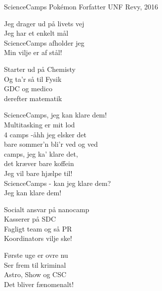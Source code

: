 \begin{song}{ScienceCamps}
  {} %
  {Pokémon} %
  {Forfatter} %
  {UNF Revy, 2016} %
  {\NotCCLIed} %

  \begin{SBVerse}
    Jeg drager ud på livets vej\\
    Jeg har et enkelt mål\\
    ScienceCamps afholder jeg\\
    Min vilje er af stål!
  \end{SBVerse}

  \begin{SBVerse}
    Starter ud på Chemisty\\
    Og ta’r så til Fysik\\
    GDC og medico\\
    derefter matematik
  \end{SBVerse}

  \begin{SBChorus}
    ScienceCamps, jeg kan klare dem!\\
    Multitasking er mit lod\\
    4 camps -åhh jeg elsker det\\
    bare sommer’n bli’r ved og ved\\ camps, jeg ka’ klare det,\\
    det kræver bare koffein\\
    Jeg vil bare hjælpe til!\\
    ScienceCamps - kan jeg klare dem?\\
    Jeg kan klare dem!
  \end{SBChorus}

  \begin{SBVerse}
    Socialt ansvar på nanocamp\\
    Kasserer på SDC\\
    Fagligt team og så PR\\
    Koordinators vilje ske!
  \end{SBVerse}

  \begin{SBVerse}
    Første uge er ovre nu\\
    Ser frem til kriminal\\
    Astro, Show og CSC\\
    Det bliver fænomenalt!
  \end{SBVerse}


\end{song}
